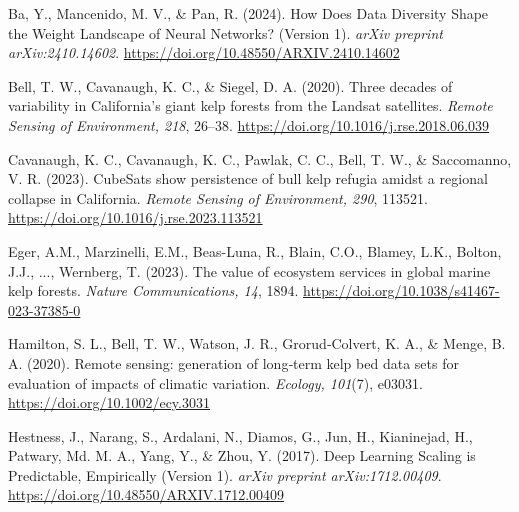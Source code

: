 \documentclass{article}
\begin{document}
\begin{thebibliography}{99} %

Ba, Y., Mancenido, M. V., \& Pan, R. (2024).
How Does Data Diversity Shape the Weight Landscape of Neural Networks? (Version 1).
\textit{arXiv preprint arXiv:2410.14602}.
\url{https://doi.org/10.48550/ARXIV.2410.14602}

Bell, T. W., Cavanaugh, K. C., \& Siegel, D. A. (2020).
Three decades of variability in California's giant kelp forests from the Landsat satellites.
\textit{Remote Sensing of Environment, 218}, 26--38.
\url{https://doi.org/10.1016/j.rse.2018.06.039}

Cavanaugh, K. C., Cavanaugh, K. C., Pawlak, C. C., Bell, T. W., \& Saccomanno, V. R. (2023).
CubeSats show persistence of bull kelp refugia amidst a regional collapse in California.
\textit{Remote Sensing of Environment, 290}, 113521.
\url{https://doi.org/10.1016/j.rse.2023.113521}

Eger, A.M., Marzinelli, E.M., Beas-Luna, R., Blain, C.O., Blamey, L.K., Bolton, J.J., ..., Wernberg, T. (2023). %
The value of ecosystem services in global marine kelp forests.
\textit{Nature Communications, 14}, 1894.
\url{https://doi.org/10.1038/s41467-023-37385-0}

Hamilton, S. L., Bell, T. W., Watson, J. R., Grorud‐Colvert, K. A., \& Menge, B. A. (2020).
Remote sensing: generation of long‐term kelp bed data sets for evaluation of impacts of climatic variation.
\textit{Ecology, 101}(7), e03031. %
\url{https://doi.org/10.1002/ecy.3031}

Hestness, J., Narang, S., Ardalani, N., Diamos, G., Jun, H., Kianinejad, H., Patwary, Md. M. A., Yang, Y., \& Zhou, Y. (2017).
Deep Learning Scaling is Predictable, Empirically (Version 1).
\textit{arXiv preprint arXiv:1712.00409}.
\url{https://doi.org/10.48550/ARXIV.1712.00409}


\end{thebibliography}
\end{document}
